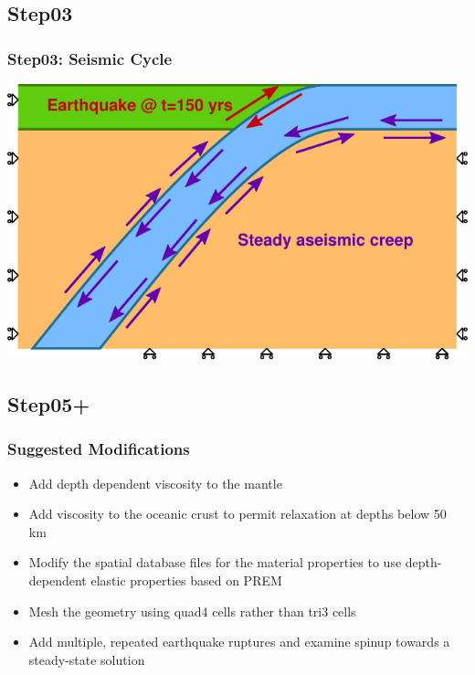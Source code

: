 \documentclass{beamer}
\begin{document}
\subsection{Step03}

\begin{frame}
  \frametitle{Step03: Seismic Cycle}
 
  \begin{center}
    \includegraphics[scale=1.0]{figs/diagram_step03}
  \end{center}

\end{frame}


\subsection{Step05+}

\begin{frame}
  \frametitle{Suggested Modifications}
 
  \begin{itemize}
  \item Add depth dependent viscosity to the mantle
  \item Add viscosity to the oceanic crust to permit relaxation at
    depths below 50 km
  \item Modify the spatial database files for the material properties
    to use depth-dependent elastic properties based on PREM
  \item Mesh the geometry using quad4 cells rather than tri3 cells
  \item Add multiple, repeated earthquake ruptures and examine spinup
    towards a steady-state solution
  \end{itemize}

\end{frame}


\end{document}
